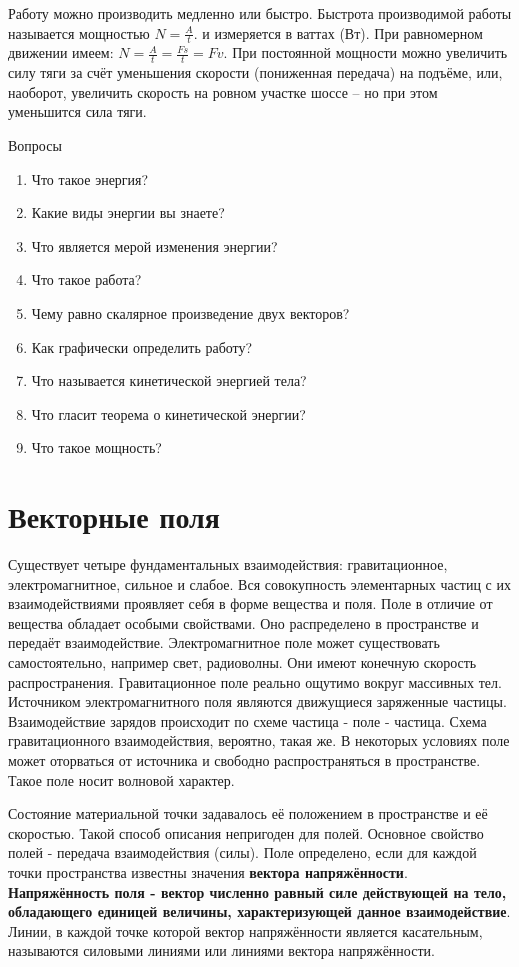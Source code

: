 \documentclass[a5paper, 10pt]{diss_4}
\renewcommand{\'}{\,'}
\begin{document}
  Работу можно производить медленно или быстро. Быстрота производимой работы
называется мощностью $N=\frac{A}{t}$. и измеряется в ваттах (Вт). При
равномерном движении имеем: $N=\frac{A}{t}=\frac{Fs}{t}=Fv$. При постоянной
мощности можно увеличить силу тяги за счёт уменьшения скорости (пониженная
передача) на подъёме, или, наоборот, увеличить скорость на ровном участке
шоссе -- но при этом уменьшится сила тяги.

\begin{center}
   Вопросы
\end{center}
\begin{enumerate}
\item Что такое энергия?
\item Какие виды энергии вы знаете?
\item Что является мерой изменения энергии?
\item Что такое работа?
\item Чему равно скалярное произведение двух векторов?
\item Как графически определить работу?
\item Что называется кинетической энергией тела?
\item Что гласит теорема о кинетической энергии?
\item Что такое мощность?
\end{enumerate}


\section{Векторные поля}

  Существует четыре фундаментальных взаимодействия: гравитационное,
электромагнитное, сильное и слабое. Вся совокупность элементарных частиц с их
взаимодействиями проявляет себя в форме вещества и поля. Поле в отличие от
вещества обладает особыми свойствами. Оно распределено в пространстве и
передаёт взаимодействие. Электромагнитное поле может существовать
самостоятельно, например свет, радиоволны. Они имеют конечную скорость
распространения. Гравитационное поле реально ощутимо вокруг массивных тел.
Источником электромагнитного поля являются движущиеся заряженные частицы.
Взаимодействие зарядов происходит по схеме частица - поле - частица. Схема
гравитационного взаимодействия, вероятно, такая же. В некоторых условиях поле
может оторваться от источника и свободно распространяться в пространстве. Такое
поле носит волновой характер.

  Состояние материальной точки задавалось её положением в пространстве и её
скоростью. Такой способ описания непригоден для полей. Основное свойство полей -
 передача взаимодействия (силы). Поле определено, если для каждой точки
пространства известны значения \textbf{вектора напряжённости}.
\textbf{Напряжённость поля - вектор численно равный силе действующей на тело,
обладающего единицей величины, характеризующей данное взаимодействие}. Линии,
в каждой точке которой вектор напряжённости является касательным, называются
силовыми линиями или линиями вектора напряжённости.
\end{document}
